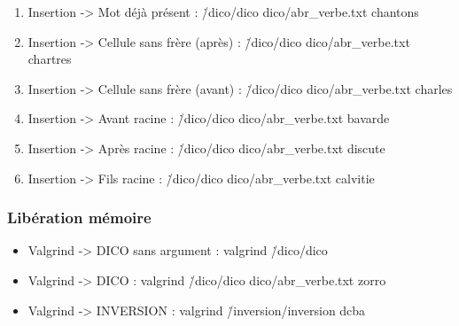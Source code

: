 \documentclass{report}
\begin{document}
\begin{enumerate}
    \item Insertion -> Mot déjà présent : \./dico/dico dico/abr\_verbe.txt chantons
\vspace{0.5cm}

\vspace{0.5cm}

    \item Insertion -> Cellule sans frère (après) : \./dico/dico dico/abr\_verbe.txt chartres
\vspace{0.5cm}

\vspace{0.5cm}

    \item Insertion -> Cellule sans frère (avant) : \./dico/dico dico/abr\_verbe.txt charles
\vspace{0.5cm}

\vspace{0.5cm}

    \item Insertion -> Avant racine : \./dico/dico dico/abr\_verbe.txt bavarde
\vspace{0.5cm}

\vspace{0.5cm}

    \item Insertion -> Après racine : \./dico/dico dico/abr\_verbe.txt discute
\vspace{0.5cm}

\vspace{0.5cm}

    \item Insertion -> Fils racine : \./dico/dico dico/abr\_verbe.txt calvitie
\vspace{0.5cm}

\vspace{0.5cm}
\end{enumerate}

\newpage
\subsubsection{Libération mémoire}
\begin{itemize}

    \item Valgrind -> DICO sans argument : valgrind \./dico/dico
\vspace{0.5cm}

\vspace{0.5cm}

    \item Valgrind -> DICO : valgrind \./dico/dico dico/abr\_verbe.txt zorro
\vspace{0.5cm}

\vspace{0.5cm}

    \item Valgrind -> INVERSION : valgrind \./inversion/inversion dcba
\vspace{0.5cm}

\vspace{0.5cm}
\end{itemize}
\end{document}
